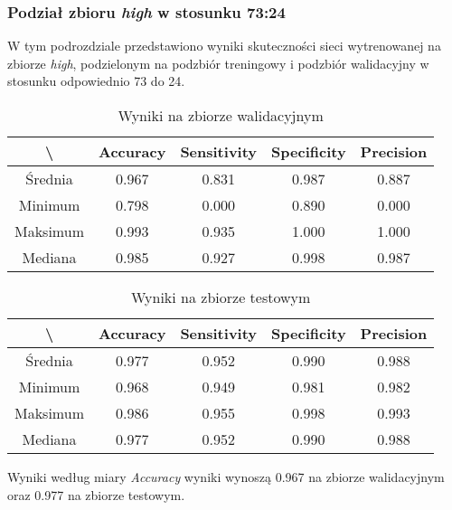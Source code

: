 \subsubsection{Podział zbioru \textit{high} w stosunku 73:24}

W tym podrozdziale przedstawiono wyniki skuteczności sieci wytrenowanej na zbiorze \textit{high}, podzielonym na podzbiór treningowy i podzbiór walidacyjny w stosunku odpowiednio 73 do 24.

\begin{table}[!h]
	\centering
	\caption{Wyniki na zbiorze walidacyjnym}
	\vspace{6pt}
	{\footnotesize
		\begin{tabular}{|c|c|c|c|c|}
      \hline \textbackslash & Accuracy & Sensitivity & Specificity & Precision \\
      \hline Średnia & 0.967 & 0.831 & 0.987 & 0.887 \\
      \hline Minimum & 0.798 & 0.000 & 0.890 & 0.000 \\
      \hline Maksimum & 0.993 & 0.935 & 1.000 & 1.000 \\
      \hline Mediana & 0.985 & 0.927 & 0.998 & 0.987 \\
      \hline
		\end{tabular}
	}
	\vspace{0pt}
\end{table}

\begin{table}[!h]
	\centering
	\caption{Wyniki na zbiorze testowym}
	\vspace{6pt}
	{\footnotesize
		\begin{tabular}{|c|c|c|c|c|}
      \hline \textbackslash & Accuracy & Sensitivity & Specificity & Precision \\
      \hline Średnia & 0.977 & 0.952 & 0.990 & 0.988 \\
      \hline Minimum & 0.968 & 0.949 & 0.981 & 0.982 \\
      \hline Maksimum & 0.986 & 0.955 & 0.998 & 0.993 \\
      \hline Mediana & 0.977 & 0.952 & 0.990 & 0.988 \\
      \hline
		\end{tabular}
	}
	\vspace{0pt}
\end{table}

Wyniki według miary \textit{Accuracy} wyniki wynoszą 0.967 na zbiorze walidacyjnym oraz 0.977 na zbiorze testowym.
